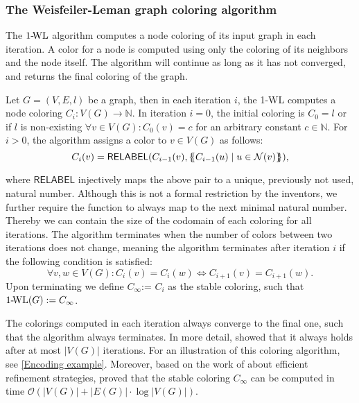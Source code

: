 \subsubsection{The Weisfeiler-Leman graph coloring algorithm}
The $\wl$ algorithm computes a node coloring of its input graph in each iteration. A color for a node is computed using only the coloring of its neighbors and the node itself. The algorithm will continue as long as it has not converged, and returns the final coloring of the graph.

\begin{definition}[$\wl$ Algorithm]
Let $G = (V, E, l)$ be a graph, then in each iteration $i$, the 1-WL computes a node coloring $C_i: V(G) \rightarrow \mathbb{N}$. In iteration $i=0$, the initial coloring is $C_0 = l$ or if $l$ is non-existing $\forall v \in V(G): C_0(v) = c$ for an arbitrary constant $c \in \mathbb{N}$. For $i > 0$, the algorithm assigns a color to $v \in V(G)$ as follows:
\begin{equation*}
C_i (v) = \textsf{RELABEL}(C_{i-1}(v), \{\!\!\{ C_{i-1}(u) \mid u \in \mathcal{N}(v) \}\!\!\}),
\end{equation*}

\noindent where $\textsf{RELABEL}$ injectively maps the above pair to a unique, previously not used, natural number. Although this is not a formal restriction by the inventors, we further require the function to always map to the next minimal natural number. Thereby we can contain the size of the codomain of each coloring for all iterations. The algorithm terminates when the number of colors between two iterations does not change, meaning the algorithm terminates after iteration $i$ if the following condition is satisfied:
\begin{equation*}
\forall v,w \in V(G):  C_i(v) = C_i(w) \iff C_{i+1}(v) = C_{i+1}(w).
\end{equation*}
Upon terminating we define $C_{\infty}$:= $C_i$ as the stable coloring, such that $\text{1-\!WL}(G) := C_\infty$.
\end{definition}


The colorings computed in each iteration always converge to the final one, such that the algorithm always terminates. In more detail, \cite{Gro2017} showed that it always holds after at most $|V(G)|$ iterations.
For an illustration of this coloring algorithm, see \autoref{Encoding example}. Moreover, based on the work of \cite{Pai+87} about efficient refinement strategies, \cite{Car+82} proved that the stable coloring $C_\infty$ can be computed in time $\mathcal{O}(| V(G) | + |E(G)| \cdot \log | V(G) |)$.

